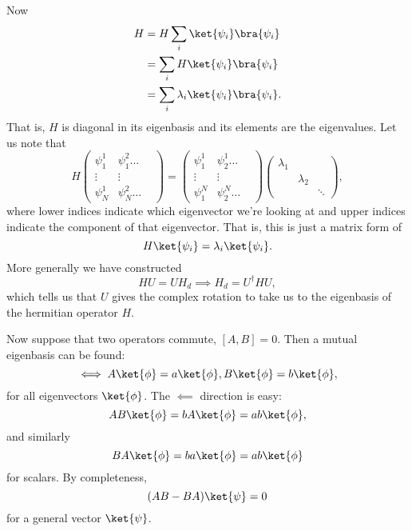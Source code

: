 Now
\begin{align}
    H &= H\sum_i \ket{\psi_i}\bra{\psi_i}\\
        &= \sum_i H\ket{\psi_i} \bra{\psi_i}\\
        &= \sum_i \lambda_i \ket{\psi_i}\bra{\psi_i}.
\end{align}
That is, $H$ is diagonal in its eigenbasis and its elements are the eigenvalues. Let us note that
\begin{equation}
    H \begin{pmatrix}
        \psi_1^1 & \psi_1^2 \ldots\\
        \vdots & \vdots &\\
        \psi^1_N & \psi^2_N \ldots
    \end{pmatrix}
    =\begin{pmatrix}
        \psi_1^1 & \psi_2^1 \ldots\\
        \vdots & \vdots &\\
        \psi_1^N & \psi_2^N \ldots
    \end{pmatrix}
    \begin{pmatrix}
        \lambda_1 &&\\
        & \lambda_2 &\\
        && \ddots
    \end{pmatrix},
\end{equation}
where lower indices indicate which eigenvector we're looking at and upper indices indicate the component of that eigenvector. That is, this is just a matrix form of
\begin{equation}
    H\ket{\psi_i} = \lambda_i \ket{\psi_i}.
\end{equation}
More generally we have constructed
\begin{equation}
    HU=UH_d \implies H_d = U^\dagger H U,
\end{equation}
which tells us that $U$ gives the complex rotation to take us to the eigenbasis of the hermitian operator $H$.

Now suppose that two operators commute, $[A,B]=0$. Then a mutual eigenbasis can be found:
\begin{equation}
    [A,B] \iff A\ket{\phi} = a \ket{\phi}, B \ket{\phi} = b\ket{\phi},
\end{equation}
for all eigenvectors $\ket{\phi}$.
The $\impliedby$ direction is easy:
\begin{equation}
    AB \ket{\phi} = bA\ket{\phi} = ab\ket{\phi},
\end{equation}
and similarly
\begin{equation}
    BA \ket{\phi}=ba \ket{\phi}=ab\ket{\phi}
\end{equation}
for scalars. By completeness,
\begin{equation}
    (AB-BA)\ket{\psi}=0
\end{equation}
for a general vector $\ket{\psi}$.

